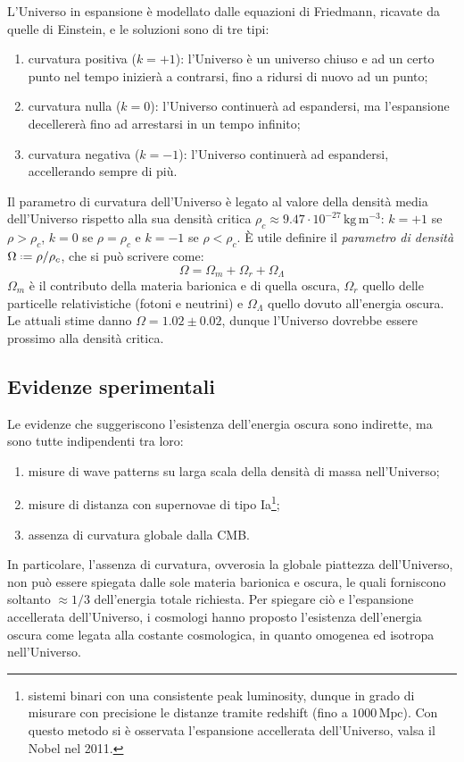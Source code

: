 L'Universo in espansione è modellato dalle equazioni di Friedmann, ricavate da quelle di Einstein, e le soluzioni sono di tre tipi:
\begin{enumerate}
	\item curvatura positiva ($ k = +1 $): l'Universo è un universo chiuso e ad un certo punto nel tempo inizierà a contrarsi, fino a ridursi di nuovo ad un punto;
	\item curvatura nulla ($ k = 0 $): l'Universo continuerà ad espandersi, ma l'espansione decellererà fino ad arrestarsi in un tempo infinito;
	\item curvatura negativa ($ k = -1 $): l'Universo continuerà ad espandersi, accellerando sempre di più.
\end{enumerate}
Il parametro di curvatura dell'Universo è legato al valore della densità media dell'Universo rispetto alla sua densità critica $ \rho_c \approx 9.47 \cdot 10^{-27} \,\text{kg} \, \text{m}^{-3} $: $ k = +1 $ se $ \rho > \rho_c $,  $ k = 0 $ se $ \rho = \rho_c $ e $ k = -1 $ se $ \rho < \rho_c $. È utile definire il \textit{parametro di densità} $ \Omega \defeq \rho / \rho_c $, che si può scrivere come:
\begin{equation}
	\Omega = \Omega_m + \Omega_r + \Omega_\Lambda
	\label{eq:11.5}
\end{equation}
$ \Omega_m $ è il contributo della materia barionica e di quella oscura, $ \Omega_r $ quello delle particelle relativistiche (fotoni e neutrini) e $ \Omega_\Lambda $ quello dovuto all'energia oscura. Le attuali stime danno $ \Omega = 1.02 \pm 0.02 $, dunque l'Universo dovrebbe essere prossimo alla densità critica.

\subsection{Evidenze sperimentali}

Le evidenze che suggeriscono l'esistenza dell'energia oscura sono indirette, ma sono tutte indipendenti tra loro:
\begin{enumerate}
	\item misure di wave patterns su larga scala della densità di massa nell'Universo;
	\item misure di distanza con supernovae di tipo Ia\footnote{sistemi binari con una consistente peak luminosity, dunque in grado di misurare con precisione le distanze tramite redshift (fino a $ 1000 \,\text{Mpc} $). Con questo metodo si è osservata l'espansione accellerata dell'Universo, valsa il Nobel nel 2011.};
	\item assenza di curvatura globale dalla CMB.
\end{enumerate}
In particolare, l'assenza di curvatura, ovverosia la globale piattezza dell'Universo, non può essere spiegata dalle sole materia barionica e oscura, le quali forniscono soltanto $ \approx 1/3 $ dell'energia totale richiesta. Per spiegare ciò e l'espansione accellerata dell'Universo, i cosmologi hanno proposto l'esistenza dell'energia oscura come legata alla costante cosmologica, in quanto omogenea ed isotropa nell'Universo.










